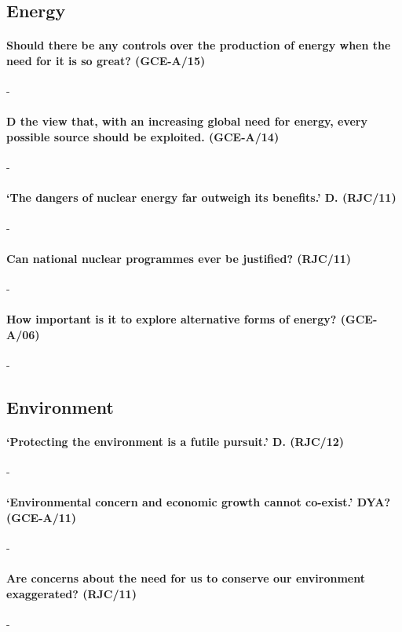 \documentclass[../../main]{subfiles}
\begin{document}
\subsection{Energy}

\paragraph{Should there be any controls over the production of energy when the need for it is so great? (GCE-A/15)}-

\paragraph{D the view that, with an increasing global need for energy, every possible source should be exploited. (GCE-A/14)}-

\paragraph{`The dangers of nuclear energy far outweigh its benefits.' D. (RJC/11)}-

\paragraph{Can national nuclear programmes ever be justified? (RJC/11)}-

\paragraph{How important is it to explore alternative forms of energy? (GCE-A/06)}-


\subsection{Environment}

\paragraph{`Protecting the environment is a futile pursuit.' D. (RJC/12)}-

\paragraph{`Environmental concern and economic growth cannot co-exist.' DYA? (GCE-A/11)}-

\paragraph{Are concerns about the need for us to conserve our environment exaggerated? (RJC/11)}-
\end{document}
